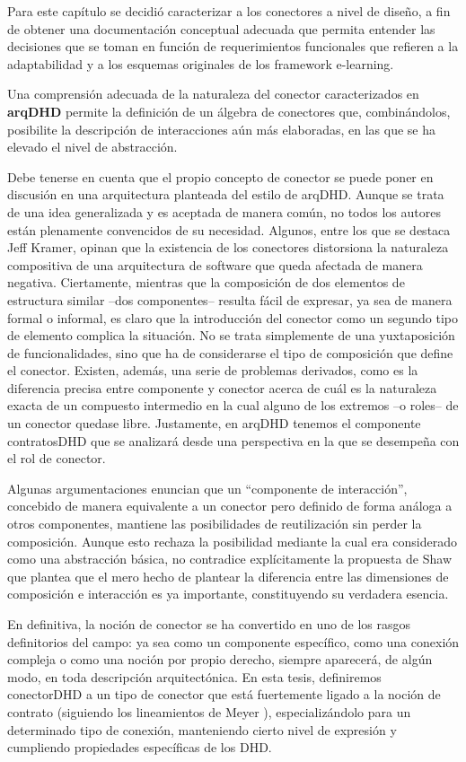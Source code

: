 Para este capítulo se decidió caracterizar a los conectores a nivel de diseño, a fin de obtener una documentación conceptual adecuada que permita entender las decisiones que se toman en función de requerimientos funcionales que refieren a la adaptabilidad y a los esquemas originales de los framework e-learning. 

Una comprensión adecuada de la naturaleza del
conector caracterizados en \textbf{arqDHD} permite la definición de un álgebra de conectores que, combinándolos, posibilite la descripción de interacciones aún más elaboradas, en las que se ha elevado el nivel de abstracción. 

Debe tenerse en cuenta que el propio concepto de conector se puede poner en discusión en una arquitectura planteada del estilo de arqDHD. Aunque se trata de una idea generalizada y es aceptada de manera común, no todos los autores están plenamente convencidos de su necesidad. Algunos, entre los que se destaca Jeff Kramer, opinan que la existencia de los conectores distorsiona la naturaleza compositiva de una arquitectura de software que queda afectada de manera negativa. Ciertamente, mientras que la composición de dos elementos de estructura similar –dos componentes– resulta fácil de expresar, ya sea de manera formal o informal, es claro que la introducción del conector como un segundo tipo de elemento complica la situación. No se trata simplemente de una
yuxtaposición de funcionalidades, sino que ha de considerarse el tipo de
composición que define el conector. Existen, además, una serie de problemas
derivados, como es la diferencia precisa entre componente y conector acerca de cuál es
la naturaleza exacta de un compuesto intermedio en la cual alguno de los
extremos –o roles– de un conector quedase libre. Justamente, en arqDHD tenemos el componente contratosDHD que se analizará desde una perspectiva en la que se desempeña con el rol de conector.

Algunas argumentaciones enuncian que un “componente de interacción”, concebido de manera equivalente a un conector pero definido de forma análoga a otros componentes, mantiene las posibilidades de reutilización sin perder la composición. Aunque esto rechaza la posibilidad mediante la cual era considerado como una abstracción básica, no contradice
explícitamente la propuesta de Shaw que plantea que el mero hecho de plantear la diferencia
entre las dimensiones de composición e interacción es ya importante, constituyendo su verdadera esencia.

En definitiva, la noción de conector se ha convertido en uno de los rasgos
definitorios del campo: ya sea como un componente específico, como una conexión
compleja o como una noción por propio derecho, siempre aparecerá, de algún modo,
en toda descripción arquitectónica. En esta tesis, definiremos conectorDHD a un tipo de conector que está
fuertemente ligado a la noción de contrato (siguiendo los lineamientos de Meyer
\cite{Meyer}), especializándolo para un determinado tipo de conexión,
manteniendo cierto nivel de expresión y cumpliendo propiedades específicas de
los DHD.


